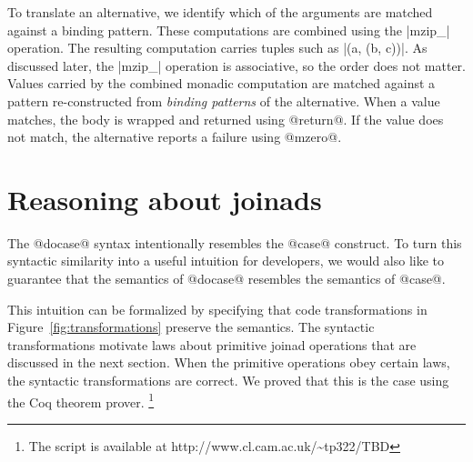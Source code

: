 \documentclass[preprint]{sigplanconf}
\begin{document}
To translate an alternative, we identify which of the arguments are matched against
a binding pattern. These computations are combined using the |mzip_| operation. The resulting 
computation carries tuples such as |(a, (b, c))|. As discussed later, the |mzip_| operation is 
associative, so the order does not matter. Values carried by the combined monadic computation 
are matched against a pattern re-constructed from \textit{binding patterns} of the alternative. 
When a value matches, the body is wrapped and returned using @return@. If the value does not match, 
the alternative reports a failure using @mzero@.


\section{Reasoning about joinads}
\label{sec:reasoning}

The @docase@ syntax intentionally resembles the @case@ construct. To turn this syntactic similarity 
into a useful intuition for developers, we would also like to guarantee that the semantics of 
@docase@ resembles the semantics of @case@. 

This intuition can be formalized by specifying that code transformations in Figure~\ref{fig:transformations} 
preserve the semantics. The syntactic transformations motivate laws about primitive joinad operations 
that are discussed in the next section. When the primitive operations obey certain laws, the syntactic
transformations are correct. We proved that this is the case using the Coq theorem prover. 
\footnote{The script is available at http://www.cl.cam.ac.uk/\textasciitilde tp322/TBD}
\end{document}

